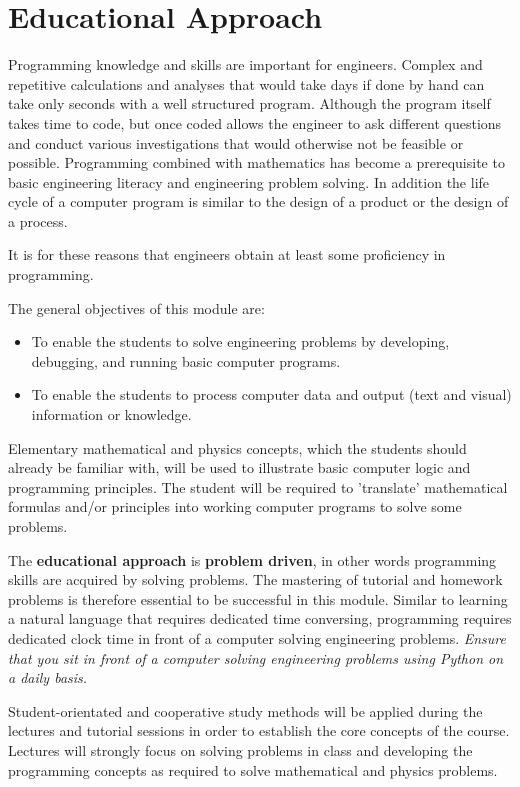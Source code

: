 \section{Educational Approach}

Programming knowledge and skills are important for engineers. Complex
and repetitive calculations and analyses that would take days if done
by hand can take only seconds with a well structured program. Although
the program itself takes time to code, but once coded allows the
engineer to ask different questions and conduct various investigations
that would otherwise not be feasible or possible. Programming combined
with mathematics has become a prerequisite to basic engineering
literacy and engineering problem solving. In addition the life cycle
of a computer program is similar to the design of a product or the
design of a process. 

It is for these reasons that engineers obtain at least some
proficiency in programming.

    The general objectives of this module are:
    \begin{itemize}
        \item To enable the students to solve engineering problems by
            developing, debugging, and running basic computer programs.
        \item To enable the students to process computer data and output
            (text and visual) information or knowledge.
    \end{itemize}

    Elementary mathematical and physics concepts, which the students
    should already be familiar with, will be used to illustrate basic
    computer logic and programming principles. The student will be
    required to 'translate' mathematical formulas and/or principles
    into working computer programs to solve some problems.

    The \textbf{educational approach} is \textbf{problem driven}, in
    other words programming skills are acquired by solving
    problems. The mastering of tutorial and homework problems is
    therefore essential to be successful in this module. Similar to
    learning a natural language that requires dedicated time
    conversing, programming requires dedicated clock time in front of
    a computer solving engineering problems. \textit{Ensure that you sit in
    front of a computer solving engineering problems using Python on a
    daily basis.}

  Student-orientated and cooperative study methods will be applied
  during the lectures and tutorial sessions in order to establish the
  core concepts of the course. Lectures will strongly focus on solving
  problems in class and developing the programming concepts as
  required to solve mathematical and physics problems.

